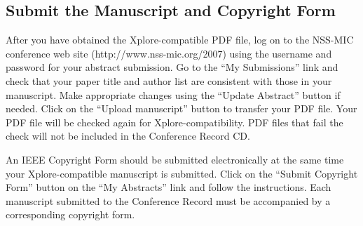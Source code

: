 \documentclass[journal]{IEEEtran}
\begin{document}

%
\vfill

\subsection{Submit the Manuscript and Copyright Form}

After you have obtained the Xplore-compatible PDF file, log on to the NSS-MIC conference web site (http://www.nss-mic.org/2007) using the username and password for your abstract submission.  Go to the ``My Submissions'' link and check that your paper title and author list are consistent with those in your manuscript. Make appropriate changes using the ``Update Abstract'' button if needed. Click on the ``Upload manuscript'' button to transfer your PDF file.  Your PDF file will be checked again for Xplore-compatibility. PDF files that fail the check will not be included in the Conference Record CD.

An IEEE Copyright Form should be submitted electronically at the same time your Xplore-compatible manuscript is submitted. Click on the ``Submit Copyright Form'' button on the ``My Abstracts'' link and follow the instructions.  Each manuscript submitted to the Conference Record must be accompanied by a corresponding copyright form. 
\end{document}
